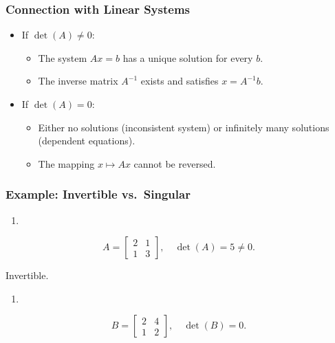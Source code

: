 \documentclass[
  letterpaper,
  DIV=11,
  numbers=noendperiod]{scrreprt}
\providecommand{\tightlist}{%
  \setlength{\itemsep}{0pt}\setlength{\parskip}{0pt}}
\begin{document}
\subsubsection{Connection with Linear
Systems}\label{connection-with-linear-systems}

\begin{itemize}
\item
  If \(\det(A) \neq 0\):

  \begin{itemize}
  \tightlist
  \item
    The system \(Ax = b\) has a unique solution for every \(b\).
  \item
    The inverse matrix \(A^{-1}\) exists and satisfies \(x = A^{-1}b\).
  \end{itemize}
\item
  If \(\det(A) = 0\):

  \begin{itemize}
  \tightlist
  \item
    Either no solutions (inconsistent system) or infinitely many
    solutions (dependent equations).
  \item
    The mapping \(x \mapsto Ax\) cannot be reversed.
  \end{itemize}
\end{itemize}

\subsubsection{Example: Invertible
vs.~Singular}\label{example-invertible-vs.-singular}

\begin{enumerate}
\def\labelenumi{\arabic{enumi}.}
\tightlist
\item
\end{enumerate}

\[
A = \begin{bmatrix} 2 & 1 \\ 1 & 3 \end{bmatrix}, \quad \det(A) = 5 \neq 0.
\]

Invertible.

\begin{enumerate}
\def\labelenumi{\arabic{enumi}.}
\setcounter{enumi}{1}
\tightlist
\item
\end{enumerate}

\[
B = \begin{bmatrix} 2 & 4 \\ 1 & 2 \end{bmatrix}, \quad \det(B) = 0.
\]
\end{document}

